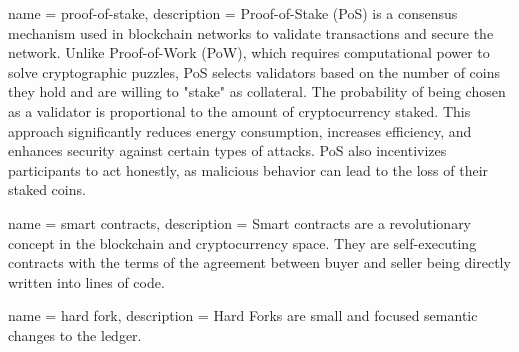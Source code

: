 {
    name = proof-of-stake,
    description = {
        Proof-of-Stake (PoS) is a consensus mechanism 
        used in blockchain networks to validate transactions and secure 
        the network. Unlike Proof-of-Work (PoW), which requires computational 
        power to solve cryptographic puzzles, PoS selects validators 
        based on the number of coins they hold and are willing to "stake" 
        as collateral. The probability of being chosen as a validator is 
        proportional to the amount of cryptocurrency staked. This approach 
        significantly reduces energy consumption, increases efficiency, 
        and enhances security against certain types of attacks. PoS also 
        incentivizes participants to act honestly, as malicious behavior 
        can lead to the loss of their staked coins.
    }
}

{
    name = smart contracts,
    description = {
        Smart contracts are a revolutionary concept in the blockchain and 
        cryptocurrency space. They are self-executing contracts with the terms 
        of the agreement between buyer and seller being directly written into 
        lines of code.
    }
}

{
    name = hard fork,
    description = {
        Hard Forks are small and focused semantic changes to the ledger.
    }
}